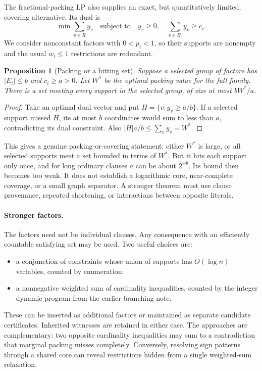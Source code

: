 \documentclass[11pt,a4paper]{article}
\newtheorem{proposition}[theorem]{Proposition}
\theoremstyle{definition}
\theoremstyle{remark}
\begin{document}
The fractional-packing LP also supplies an exact, but quantitatively
limited, covering alternative. Its dual is
\begin{equation}
 \min\sum_{v\in R}y_v
 \quad\text{subject to}\quad
 y_v\ge0,\quad \sum_{v\in E_i}y_v\ge c_i.             \label{eq:dual}
\end{equation}
We consider nonconstant factors with $0<p_i<1$, so their supports are
nonempty and the usual $w_i\le1$ restrictions are redundant.

\begin{proposition}[Packing or a hitting set]\label{prop:dual}
Suppose a selected group of factors has $|E_i|\le b$ and $c_i\ge a>0$.
Let $W^*$ be the optimal packing value for the full family. There is a set
meeting every support in the selected group, of size at most $bW^*/a$.
\end{proposition}
\begin{proof}
Take an optimal dual vector and put $H=\{v:y_v\ge a/b\}$.
If a selected support missed $H$, its at most $b$ coordinates would
sum to less than $a$, contradicting its dual constraint. Also
$|H|a/b\le\sum_vy_v=W^*$.
\end{proof}

This gives a genuine packing-or-covering statement: either $W^*$ is large,
or all selected supports meet a set bounded in terms of $W^*$.
But it hits each support only once, and for long ordinary clauses
$a$ can be about $2^{-b}$. Its bound then becomes too weak. It does not
establish a logarithmic core, near-complete coverage, or a small graph
separator. A stronger theorem must use clause provenance, repeated
shortening, or interactions between opposite literals.

\paragraph{Stronger factors.}
The factors need not be individual clauses. Any consequence with an
efficiently countable satisfying set may be used. Two useful choices are:
\begin{itemize}
\item a conjunction of constraints whose union of supports has
$O(\log n)$ variables, counted by enumeration;
\item a nonnegative weighted sum of cardinality inequalities, counted by
the integer dynamic program from the earlier branching note.
\end{itemize}
These can be inserted as additional factors or maintained as separate
candidate certificates. Inherited witnesses are retained in either case.
The approaches are complementary: two opposite cardinality inequalities
may sum to a contradiction that marginal packing misses completely.
Conversely, resolving sign patterns through a shared core can reveal
restrictions hidden from a single weighted-sum relaxation.
\end{document}
